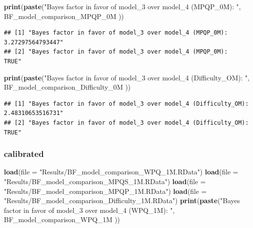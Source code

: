 \documentclass[
]{article}
\newenvironment{Shaded}{\begin{snugshade}}{\end{snugshade}}
\newcommand{\AttributeTok}[1]{\textcolor[rgb]{0.13,0.29,0.53}{#1}}
\newcommand{\FunctionTok}[1]{\textcolor[rgb]{0.13,0.29,0.53}{\textbf{#1}}}
\newcommand{\NormalTok}[1]{#1}
\newcommand{\StringTok}[1]{\textcolor[rgb]{0.31,0.60,0.02}{#1}}
\begin{document}
\begin{Shaded}
\begin{Highlighting}[]
\FunctionTok{print}\NormalTok{(}\FunctionTok{paste}\NormalTok{(}\StringTok{"Bayes factor in favor of model\_3 over model\_4 (MPQP\_0M): "}\NormalTok{, BF\_model\_comparison\_MPQP\_0M ))}
\end{Highlighting}
\end{Shaded}

\begin{verbatim}
## [1] "Bayes factor in favor of model_3 over model_4 (MPQP_0M):  3.27297564793447"
## [2] "Bayes factor in favor of model_3 over model_4 (MPQP_0M):  TRUE"
\end{verbatim}

\begin{Shaded}
\begin{Highlighting}[]
\FunctionTok{print}\NormalTok{(}\FunctionTok{paste}\NormalTok{(}\StringTok{"Bayes factor in favor of model\_3 over model\_4 (Difficulty\_OM): "}\NormalTok{, BF\_model\_comparison\_Difficulty\_0M ))}
\end{Highlighting}
\end{Shaded}

\begin{verbatim}
## [1] "Bayes factor in favor of model_3 over model_4 (Difficulty_OM):  2.48310653516731"
## [2] "Bayes factor in favor of model_3 over model_4 (Difficulty_OM):  TRUE"
\end{verbatim}

\hypertarget{calibrated}{%
\subsubsection{calibrated}\label{calibrated}}

\begin{Shaded}
\begin{Highlighting}[]
\FunctionTok{load}\NormalTok{(}\AttributeTok{file =} \StringTok{"Results/BF\_model\_comparison\_WPQ\_1M.RData"}\NormalTok{)}
\FunctionTok{load}\NormalTok{(}\AttributeTok{file =} \StringTok{"Results/BF\_model\_comparison\_MPQS\_1M.RData"}\NormalTok{)}
\FunctionTok{load}\NormalTok{(}\AttributeTok{file =} \StringTok{"Results/BF\_model\_comparison\_MPQP\_1M.RData"}\NormalTok{)}
\FunctionTok{load}\NormalTok{(}\AttributeTok{file =} \StringTok{"Results/BF\_model\_comparison\_Difficulty\_1M.RData"}\NormalTok{)}
\FunctionTok{print}\NormalTok{(}\FunctionTok{paste}\NormalTok{(}\StringTok{"Bayes factor in favor of model\_3 over model\_4 (WPQ\_1M): "}\NormalTok{, BF\_model\_comparison\_WPQ\_1M ))}
\end{Highlighting}
\end{Shaded}
\end{document}
